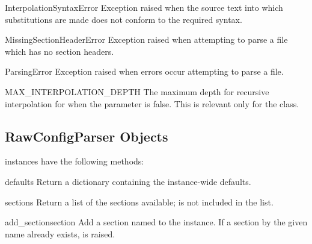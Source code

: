 \begin{excdesc}{InterpolationSyntaxError}
Exception raised when the source text into which substitutions are
made does not conform to the required syntax.
\end{excdesc}

\begin{excdesc}{MissingSectionHeaderError}
Exception raised when attempting to parse a file which has no section
headers.
\end{excdesc}

\begin{excdesc}{ParsingError}
Exception raised when errors occur attempting to parse a file.
\end{excdesc}

\begin{datadesc}{MAX_INTERPOLATION_DEPTH}
The maximum depth for recursive interpolation for  when
the  parameter is false.  This is relevant only for the
 class.
\end{datadesc}


\begin{seealso}
\end{seealso}


\subsection{RawConfigParser Objects \label{RawConfigParser-objects}}

 instances have the following methods:

\begin{methoddesc}{defaults}{}
Return a dictionary containing the instance-wide defaults.
\end{methoddesc}

\begin{methoddesc}{sections}{}
Return a list of the sections available;  is not
included in the list.
\end{methoddesc}

\begin{methoddesc}{add_section}{section}
Add a section named  to the instance.  If a section by
the given name already exists,  is
raised.
\end{methoddesc}

